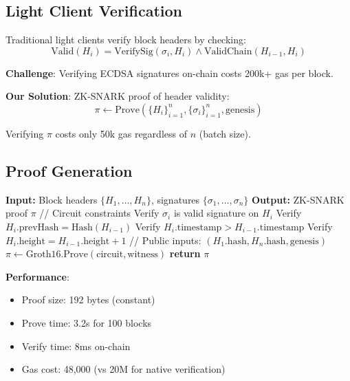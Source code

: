 \documentclass[11pt]{article}
\begin{document}
\subsection{Light Client Verification}

Traditional light clients verify block headers by checking:
\begin{equation}
\text{Valid}(H_i) = \text{VerifySig}(\sigma_i, H_i) \land \text{ValidChain}(H_{i-1}, H_i)
\end{equation}

\textbf{Challenge}: Verifying ECDSA signatures on-chain costs 200k+ gas per block.

\textbf{Our Solution}: ZK-SNARK proof of header validity:
\begin{equation}
\pi \leftarrow \text{Prove}\left(\{H_i\}_{i=1}^n, \{\sigma_i\}_{i=1}^n, \text{genesis}\right)
\end{equation}

Verifying $\pi$ costs only 50k gas regardless of $n$ (batch size).

\subsection{Proof Generation}

\begin{algorithm}[H]
\caption{ZK Light Client Proof Generation}
\begin{algorithmic}[1]
\State \textbf{Input:} Block headers $\{H_1, \ldots, H_n\}$, signatures $\{\sigma_1, \ldots, \sigma_n\}$
\State \textbf{Output:} ZK-SNARK proof $\pi$
\State
\State // Circuit constraints
  \State Verify $\sigma_i$ is valid signature on $H_i$
  \State Verify $H_i.\text{prevHash} = \text{Hash}(H_{i-1})$
  \State Verify $H_i.\text{timestamp} > H_{i-1}.\text{timestamp}$
  \State Verify $H_i.\text{height} = H_{i-1}.\text{height} + 1$
\EndFor
\State
\State // Public inputs: $(H_1.\text{hash}, H_n.\text{hash}, \text{genesis})$
\State $\pi \leftarrow \text{Groth16.Prove}(\text{circuit}, \text{witness})$
\State \textbf{return} $\pi$
\end{algorithmic}
\end{algorithm}

\textbf{Performance}:
\begin{itemize}[leftmargin=1.1em]
  \item Proof size: 192 bytes (constant)
  \item Prove time: 3.2s for 100 blocks
  \item Verify time: 8ms on-chain
  \item Gas cost: 48,000 (vs 20M for native verification)
\end{itemize}
\end{document}
